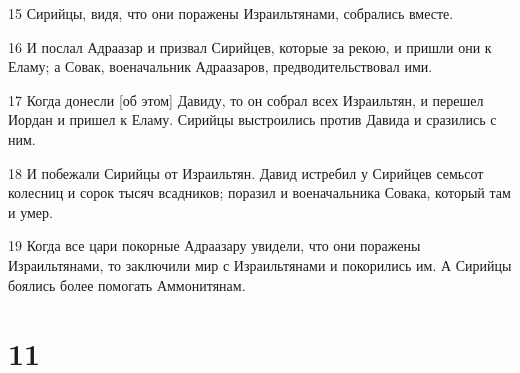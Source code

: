 \par 15 Сирийцы, видя, что они поражены Израильтянами, собрались вместе.
\par 16 И послал Адраазар и призвал Сирийцев, которые за рекою, и пришли они к Еламу; а Совак, военачальник Адраазаров, предводительствовал ими.
\par 17 Когда донесли [об этом] Давиду, то он собрал всех Израильтян, и перешел Иордан и пришел к Еламу. Сирийцы выстроились против Давида и сразились с ним.
\par 18 И побежали Сирийцы от Израильтян. Давид истребил у Сирийцев семьсот колесниц и сорок тысяч всадников; поразил и военачальника Совака, который там и умер.
\par 19 Когда все цари покорные Адраазару увидели, что они поражены Израильтянами, то заключили мир с Израильтянами и покорились им. А Сирийцы боялись более помогать Аммонитянам.

\chapter{11}

